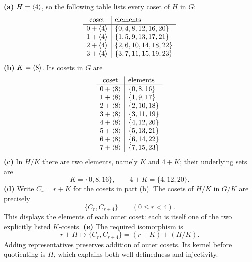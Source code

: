 \textbf{(a)} $H=\langle 4\rangle$, so the following table lists every coset of $H$ in $G$:
\[\begin{array}{c|l}\text{coset}&\text{elements}\\\hline
0+\langle 4\rangle & \{0,4,8,12,16,20\} \\
1+\langle 4\rangle & \{1,5,9,13,17,21\} \\
2+\langle 4\rangle & \{2,6,10,14,18,22\} \\
3+\langle 4\rangle & \{3,7,11,15,19,23\} \\\end{array}\]\textbf{(b)} $K=\langle 8\rangle$. Its cosets in $G$ are
\[\begin{array}{c|l}\text{coset}&\text{elements}\\\hline
0+\langle 8\rangle & \{0,8,16\} \\
1+\langle 8\rangle & \{1,9,17\} \\
2+\langle 8\rangle & \{2,10,18\} \\
3+\langle 8\rangle & \{3,11,19\} \\
4+\langle 8\rangle & \{4,12,20\} \\
5+\langle 8\rangle & \{5,13,21\} \\
6+\langle 8\rangle & \{6,14,22\} \\
7+\langle 8\rangle & \{7,15,23\} \\\end{array}\]\textbf{(c)} In $H/K$ there are two elements, namely $K$ and $4+K$; their underlying sets are
\[
K=\{0,8,16\},\qquad
4+K=\{4,12,20\}.
\]
\textbf{(d)} Write $C_r=r+K$ for the cosets in part (b). The cosets of $H/K$ in $G/K$ are precisely
\[
\{C_r,C_{r+4}\}\qquad(0\le r<4).
\]
This displays the elements of each outer coset: each is itself one of the two explicitly listed $K$-cosets.
\textbf{(e)} The required isomorphism is
\[
r+H\longmapsto\{C_r,C_{r+4}\}=(r+K)+(H/K).
\]
Adding representatives preserves addition of outer cosets. Its kernel before quotienting is $H$, which explains both well-definedness and injectivity.

